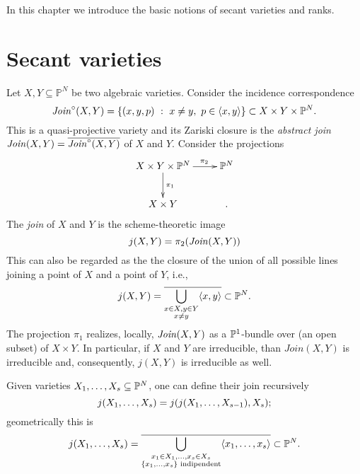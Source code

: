  In this chapter we introduce the basic notions of secant varieties and ranks. 
 
 \section{Secant varieties}
 \label{geometrySecants-section-secants}
 
 \begin{definition}
 \label{geometrySecants-definition-join}
 Let $X,Y \subseteq \mathbb{P}^N$ be two algebraic varieties. Consider the incidence correspondence 
 \[
     \mathit{Join}^\circ(X,Y) = \{(x,y,p) ~:~ x \neq y,~p \in \langle x,y \rangle\} \subset X \times Y \times \mathbb{P}^N.
 \]
 This is a quasi-projective variety and its Zariski closure is the {\it abstract join} $\mathit{Join}(X,Y) = \overline{\mathit{Join}^\circ(X,Y)}$ of $X$ and $Y$. Consider the projections 
 \[
     \xymatrix{
         X \times Y \times \bbP^N \ar[d]^{\pi_1} \ar[r]^(0.65){\pi_2} & \bbP^N\\
         X \times Y & .
     }
 \]
 The \emph{join} of $X$ and $Y$ is the scheme-theoretic image 
 \[
     j(X,Y) = \pi_2(\mathit{Join}(X,Y))
 \]
 This can also be regarded as the the closure of the union of all possible lines joining a point of $X$ and a point of $Y$, i.e.,
 \[
     j(X,Y) = \overline{ \bigcup_{\substack{x \in X, y \in Y \\ x \neq y}} \langle x,y \rangle} \subset \mathbb{P}^N.
 \]
 The projection $\pi_1$ realizes, locally, $\mathit{Join}(X,Y)$ as a $\mathbb{P}^1$-bundle over (an open subset) of $X \times Y$. In particular, if $X$ and $Y$ are irreducible, than $Join(X,Y)$ is irreducible and, consequently, $j(X,Y)$ is irreducible as well.
 
 Given varieties $X_1 , \ldots , X_s \subseteq \mathbb{P}^N$, one can define their join recursively
 \[
     j( X_1 , \ldots , X_s) = j( j(X_1 , \ldots , X_{s-1}), X_s);
 \]
 geometrically this is 
 \[
     j( X_1 , \ldots , X_s) = \overline{\bigcup_{\substack{x_1 \in X_1,\ldots,x_s \in X_s \\ \{x_1,\ldots,x_s\} \text{ indipendent}}} \langle x_1,\ldots,x_s \rangle} \subset \mathbb{P}^N.
 \]
 \end{definition}
 
